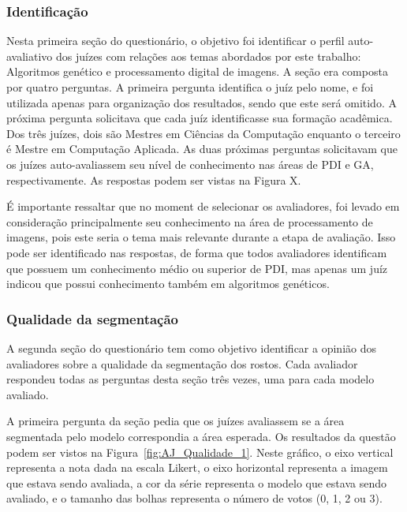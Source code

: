 \documentclass[12pt,oneside,a4paper,english,french,spanish,brazil,]{abntex2}
\begin{document}
\subsubsection{Identificação}

Nesta primeira seção do questionário, o objetivo foi identificar o perfil auto-avaliativo dos juízes com relações aos temas abordados por este trabalho: Algoritmos genético e processamento digital de imagens. A seção era composta por quatro perguntas. A primeira pergunta identifica o juíz pelo nome, e foi utilizada apenas para organização dos resultados, sendo que este será omitido. A próxima pergunta solicitava que cada juíz identificasse sua formação acadêmica. Dos três juízes, dois são Mestres em Ciências da Computação enquanto o terceiro é Mestre em Computação Aplicada. As duas próximas perguntas solicitavam que os juízes auto-avaliassem seu nível de conhecimento nas áreas de PDI e GA, respectivamente. As respostas podem ser vistas na Figura X.


É importante ressaltar que no moment de selecionar os avaliadores, foi levado em consideração principalmente seu conhecimento na área de processamento de imagens, pois este seria o tema mais relevante durante a etapa de avaliação. Isso pode ser identificado nas respostas, de forma que todos avaliadores identificam que possuem um conhecimento médio ou superior de PDI, mas apenas um juíz indicou que possui conhecimento também em algoritmos genéticos.

\subsubsection{Qualidade da segmentação}

A segunda seção do questionário tem como objetivo identificar a opinião dos avaliadores sobre a qualidade da segmentação dos rostos. Cada avaliador respondeu todas as perguntas desta seção três vezes, uma para cada modelo avaliado. 

A primeira pergunta da seção pedia que os juízes avaliassem se a área segmentada pelo modelo correspondia a área esperada. Os resultados da questão podem ser vistos na Figura~\ref{fig:AJ_Qualidade_1}. Neste gráfico, o eixo vertical representa a nota dada na escala Likert, o eixo horizontal representa a imagem que estava sendo avaliada, a cor da série representa o modelo que estava sendo avaliado, e o tamanho das bolhas representa o número de votos (0, 1, 2 ou 3).
\end{document}
